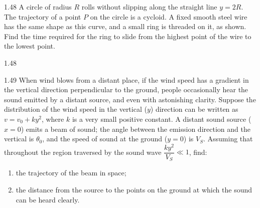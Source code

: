\begin{problem}{1.48}
A circle of radius $R$ rolls without slipping along the straight line $y=2R$. The trajectory of a point $P$ on the circle is a cycloid. A fixed smooth steel wire has the same shape as this curve, and a small ring is threaded on it, as shown. Find the time required for the ring to slide from the highest point of the wire to the lowest point.
\end{problem}

\begin{figbox}{1.48}
\end{figbox}

\begin{problem}{1.49}
When wind blows from a distant place, if the wind speed has a gradient in the vertical direction perpendicular to the ground, people occasionally hear the sound emitted by a distant source, and even with astonishing clarity. Suppose the distribution of the wind speed in the vertical ($y$) direction can be written as $v=v_0+ky^2$, where $k$ is a very small positive constant. A distant sound source ($x=0$) emits a beam of sound; the angle between the emission direction and the vertical is $\theta_0$, and the speed of sound at the ground ($y=0$) is $V_S$. Assuming that throughout the region traversed by the sound wave $\dfrac{ky^2}{V_S}\ll 1$, find:
\begin{enumerate}[label=(\arabic*),leftmargin=2.2em,itemsep=1pt,topsep=2pt]
\item the trajectory of the beam in space;
\item the distance from the source to the points on the ground at which the sound can be heard clearly.
\end{enumerate}
\end{problem}

